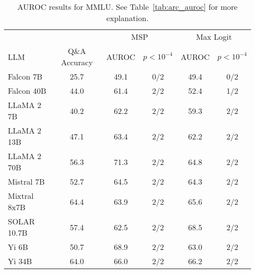 \begin{table*}
\centering
\caption{AUROC results for MMLU. See Table~\ref{tab:arc_auroc} for more explanation.}
\label{tab:mmlu_auroc}
\begin{tabular}{lccccc}
\toprule
& & \multicolumn{2}{c}{MSP} & \multicolumn{2}{c}{Max Logit} \\ 
LLM & Q\&A Accuracy & AUROC & $p < 10^{-4}$ & AUROC & $p < 10^{-4}$\\ 
\cmidrule(lr){1-1} \cmidrule(lr){2-2} \cmidrule(lr){3-4} \cmidrule(lr){5-6}
Falcon 7B & 25.7 & 49.1 & 0/2 & 49.4 & 0/2 \\
Falcon 40B & 44.0 & 61.4 & 2/2 & 52.4 & 1/2 \\
LLaMA 2 7B & 40.2 & 62.2 & 2/2 & 59.3 & 2/2\\
LLaMA 2 13B & 47.1 & 63.4 & 2/2 & 62.2 & 2/2\\
LLaMA 2 70B & 56.3 & 71.3 & 2/2 & 64.8 & 2/2\\
Mistral 7B & 52.7 & 64.5 & 2/2 & 64.3 & 2/2 \\
Mixtral 8x7B & 64.4 & 63.9 & 2/2 & 65.6 & 2/2\\
SOLAR 10.7B & 57.4 & 62.5 & 2/2 & 68.5 & 2/2 \\
Yi 6B & 50.7 & 68.9 & 2/2 & 63.0 & 2/2\\
Yi 34B & 64.0 & 66.0 & 2/2 & 66.2 & 2/2\\
\bottomrule
\end{tabular}
\end{table*}

